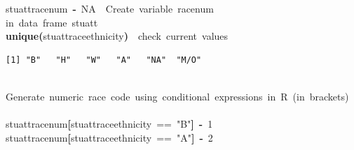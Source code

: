\documentclass[12pt]{article}
\makeatletter
\newcommand{\hlnumber}[1]{\textcolor[rgb]{0,0,0}{#1}}%
\newcommand{\hlfunctioncall}[1]{\textcolor[rgb]{0.501960784313725,0,0.329411764705882}{\textbf{#1}}}%
\newcommand{\hlstring}[1]{\textcolor[rgb]{0.6,0.6,1}{#1}}%
\newcommand{\hlkeyword}[1]{\textcolor[rgb]{0,0,0}{\textbf{#1}}}%
\newcommand{\hlcomment}[1]{\textcolor[rgb]{0.180392156862745,0.6,0.341176470588235}{#1}}%
\newcommand{\hlassignement}[1]{\textcolor[rgb]{0,0,0}{\textbf{#1}}}%
\newcommand{\hlsymbol}[1]{\textcolor[rgb]{0,0,0}{#1}}%
\newcommand{\hlstd}[1]{\textcolor[rgb]{0,0,0}{#1}}%
\newenvironment{kframe}{%
 \def\FrameCommand##1{\hskip\@totalleftmargin \hskip-\fboxsep
 \colorbox{shadecolor}{##1}\hskip-\fboxsep
     \hskip-\linewidth \hskip-\@totalleftmargin \hskip\columnwidth}%
 \MakeFramed {\advance\hsize-\width
   \@totalleftmargin\z@ \linewidth\hsize
   \@setminipage}}%
 {\par\unskip\endMakeFramed}
\newenvironment{knitrout}{}{} %
\renewenvironment{knitrout}{\begin{footnotesize}}{\end{footnotesize}}
\makeatother
\begin{document}
\begin{knitrout}
\color{fgcolor}\begin{kframe}
\begin{flushleft}
\ttfamily\noindent
\hlsymbol{stuatt}\hlkeyword{\usebox{\hlnormalsizeboxdollar}}\hlsymbol{race\usebox{\hlnormalsizeboxunderscore}num}{\ }\hlassignement{\usebox{\hlnormalsizeboxlessthan}-}{\ }\hlnumber{NA}{\ }{\ }\hlcomment{\usebox{\hlnormalsizeboxhash}{\ }Create{\ }variable{\ }race\usebox{\hlnormalsizeboxunderscore}num}\hspace*{\fill}\\
\hlstd{}\hlcomment{\usebox{\hlnormalsizeboxhash}{\ }in{\ }data{\ }frame{\ }stuatt}\hspace*{\fill}\\
\hlstd{}\hlfunctioncall{unique}\hlkeyword{(}\hlsymbol{stuatt}\hlkeyword{\usebox{\hlnormalsizeboxdollar}}\hlsymbol{race\usebox{\hlnormalsizeboxunderscore}ethnicity}\hlkeyword{)}{\ }{\ }\hlcomment{\usebox{\hlnormalsizeboxhash}check{\ }current{\ }values}\mbox{}
\normalfont
\end{flushleft}
\begin{verbatim}
[1] "B"   "H"   "W"   "A"   "NA"  "M/O"
\end{verbatim}
\begin{flushleft}
\ttfamily\noindent
\hspace*{\fill}\\
\hlstd{}\hlcomment{\usebox{\hlnormalsizeboxhash}{\ }Generate{\ }numeric{\ }race{\ }code{\ }using{\ }conditional{\ }expressions{\ }in{\ }R{\ }(in{\ }brackets)}\hspace*{\fill}\\
\hlstd{}\hspace*{\fill}\\
\hlstd{}\hlsymbol{stuatt}\hlkeyword{\usebox{\hlnormalsizeboxdollar}}\hlsymbol{race\usebox{\hlnormalsizeboxunderscore}num}\hlkeyword{[}\hlsymbol{stuatt}\hlkeyword{\usebox{\hlnormalsizeboxdollar}}\hlsymbol{race\usebox{\hlnormalsizeboxunderscore}ethnicity}{\ }=={\ }\hlstring{"{}B"{}}\hlkeyword{]}{\ }\hlassignement{\usebox{\hlnormalsizeboxlessthan}-}{\ }\hlnumber{1}\hspace*{\fill}\\
\hlstd{}\hlsymbol{stuatt}\hlkeyword{\usebox{\hlnormalsizeboxdollar}}\hlsymbol{race\usebox{\hlnormalsizeboxunderscore}num}\hlkeyword{[}\hlsymbol{stuatt}\hlkeyword{\usebox{\hlnormalsizeboxdollar}}\hlsymbol{race\usebox{\hlnormalsizeboxunderscore}ethnicity}{\ }=={\ }\hlstring{"{}A"{}}\hlkeyword{]}{\ }\hlassignement{\usebox{\hlnormalsizeboxlessthan}-}{\ }\hlnumber{2}\hspace*{\fill}\\

\end{flushleft}
\end{kframe}
\end{knitrout}
\end{document}

